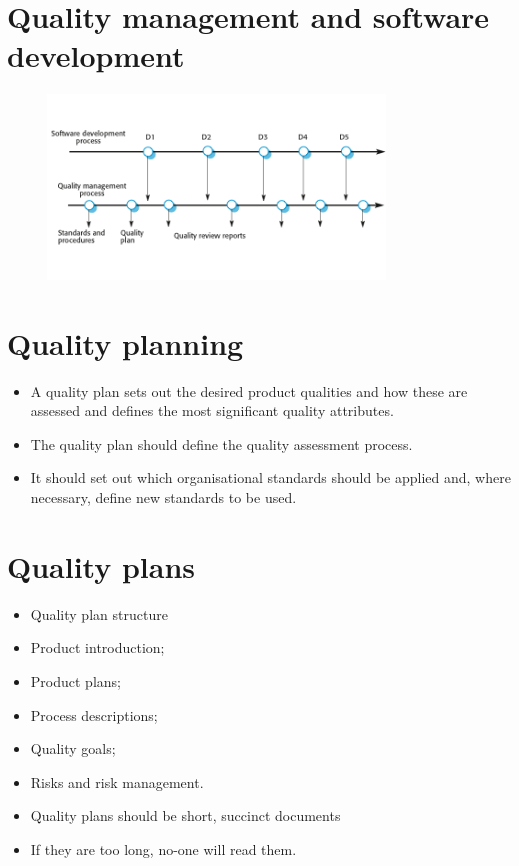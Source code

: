 \section {Quality management and software development}
\begin{figure}[h!]
    \centering
    \includegraphics[width = 0.8\textwidth]{./figures/L7_1.png}
    \caption{}
    \label{fig:L7_1}
\end{figure}






\section {Quality planning}
\begin{itemize}
\item A quality plan sets out the desired product qualities and how these are assessed and defines the most significant quality attributes.

\item The quality plan should define the quality assessment process.

\item It should set out which organisational standards should be applied and, where necessary, define new standards to be used.
\end{itemize}


\section {Quality plans}
\begin{itemize}

\item Quality plan structure   \item Product introduction;   \item Product plans;   \item Process descriptions;   \item Quality goals;
  \item Risks and risk management.

\item Quality plans should be short, succinct documents   \item If they are too long, no-one will read them.
\end{itemize}

